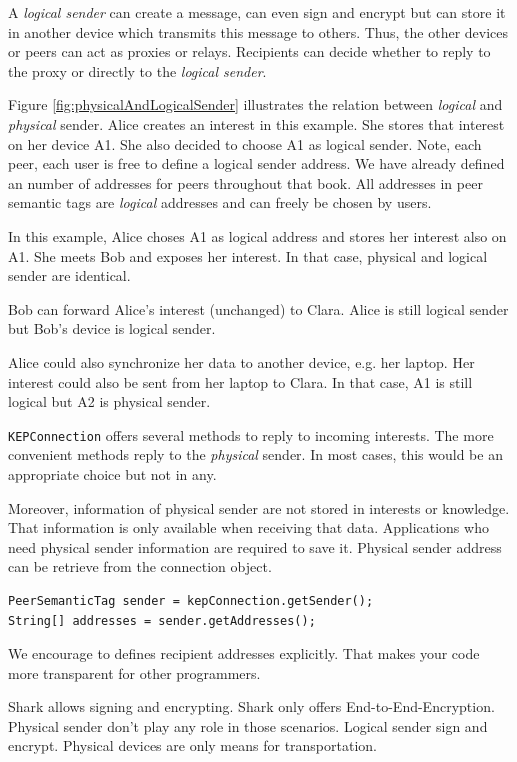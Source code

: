 A {\it logical sender} can create a message, can even sign and encrypt but can store it in another device which transmits this message to others. Thus, the other devices or peers can act as proxies or relays. Recipients can decide whether to reply to the proxy or directly to the {\it logical sender}. 

Figure \ref{fig:physicalAndLogicalSender} illustrates the relation between {\it logical} and {\it physical} sender. Alice creates an interest in this example. She stores that interest on her device A1. She also decided to choose A1 as logical sender. Note, each peer, each user is free to define a logical sender address. We have already defined an number of addresses for peers throughout that book. All addresses in peer semantic tags are {\it logical} addresses and can freely be chosen by users.

In this example, Alice choses A1 as logical address and stores her interest also on A1. She meets Bob and exposes her interest. In that case, physical and logical sender are identical.

Bob can forward Alice's interest (unchanged) to Clara. Alice is still logical sender but Bob's device is logical sender. 

Alice could also synchronize her data to another device, e.g. her laptop. Her interest could also be sent from her laptop to Clara. In that case, A1 is still logical but A2 is physical sender.

{\tt KEPConnection} offers several methods to reply to incoming interests. The more convenient methods reply to the {\it physical} sender. In most cases, this would be an appropriate choice but not in any. 

Moreover, information of physical sender are not stored in interests or knowledge. That information is only available when receiving that data.
Applications who need physical sender information are required to save it.
Physical sender address can be retrieve from the connection object.

\begin{verbatim}
PeerSemanticTag sender = kepConnection.getSender();
String[] addresses = sender.getAddresses();
\end{verbatim}

We encourage to defines recipient addresses explicitly. That makes your code more transparent for other programmers.

Shark allows signing and encrypting. Shark only offers End-to-End-Encryption. Physical sender don't play any role in those scenarios. Logical sender sign and encrypt. Physical devices are only means for transportation.

